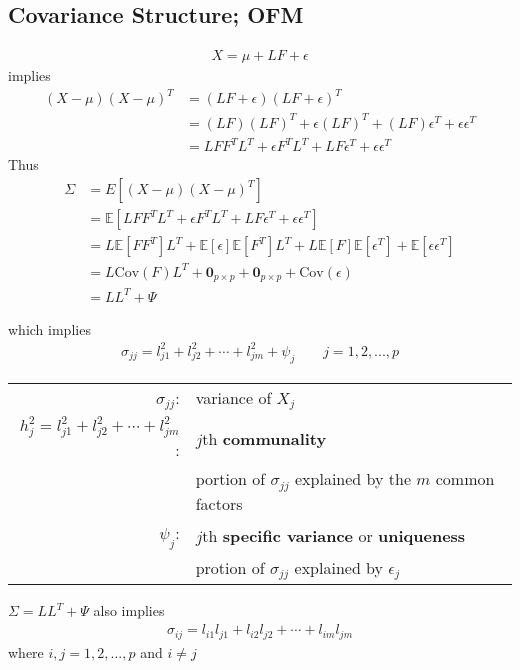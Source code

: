 \documentclass[12pt]{extarticle}
\newcommand{\<}{\langle}
\renewcommand{\>}{\rangle}
\theoremstyle{definition}
\begin{document}
\subsection{Covariance Structure; OFM}
\begin{align*}
    X=\mu + LF + \epsilon
\end{align*}
implies
\begin{align*}
    (X-\mu)(X-\mu)^T &= (LF+\epsilon)(LF+\epsilon)^T\\
    &= (LF)(LF)^T + \epsilon(LF)^T + (LF)\epsilon^T + \epsilon \epsilon^T\\
    &= LFF^T L^T + \epsilon F^T L^T + LF\epsilon^T + \epsilon \epsilon^T
\end{align*}
Thus
\begin{align*}
    \Sigma &= E[(X-\mu)(X-\mu)^T]\\
    &= \mathbb{E}[LFF^T L^T + \epsilon F^T L^T + LF\epsilon^T + \epsilon \epsilon^T]\\
    &= L\mathbb{E}[FF^T]L^T + \mathbb{E}[\epsilon] \mathbb{E}[F^T] L^T + L\mathbb{E}[F]\mathbb{E}[\epsilon^T] + \mathbb{E}[\epsilon \epsilon^T]\\
    &= L\text{Cov}(F)L^T + \textbf{0}_{p\times p} + \textbf{0}_{p\times p} + \text{Cov}(\epsilon)\\
    &=LL^T + \Psi
\end{align*}

which implies
\begin{align*}
    \sigma_{jj}=l^2_{j1} +l^2_{j2} +\cdots +l^2_{jm} +\psi_j \qquad j=1,2,...,p
\end{align*}

\begin{tabular}{rl}
    $\sigma_{jj}$:& variance of $X_j$\\
    $h^2_j=l^2_{j1}+l^2_{j2}+\cdots+l^2_{jm}$:& $j$th \textbf{communality}\\
    & portion of $\sigma_{jj}$ explained by the $m$ common factors \\
    $\psi_j$:& $j$th \textbf{specific variance} or \textbf{uniqueness}\\
    & protion of $\sigma_{jj}$ explained by $\epsilon_j$
\end{tabular}
$\Sigma=LL^T + \Psi$ also implies
\begin{align*}
    \sigma_{ij}=l_{i1}l_{j1} + l_{i2}l_{j2} + \cdots + l_{im}l_{jm}
\end{align*}
where $i,j=1,2,...,p$ and $i \neq j$
\end{document}
